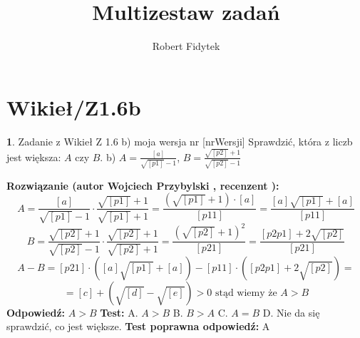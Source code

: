 \documentclass[12pt, a4paper]{article}
\title{Multizestaw zadań}
\author{Robert Fidytek}
\date{}
\theoremstyle{definition} %
\newtheorem{zad}{}
\newcommand{\kategoria}[1]{\section{#1}} %
\newcommand{\zadStart}[1]{\begin{zad}#1\newline} %
\newcommand{\zadStop}{\end{zad}}   %
\newcommand{\rozwStart}[2]{\noindent \textbf{Rozwiązanie (autor #1 , recenzent #2): }\newline} %
\newcommand{\rozwStop}{\newline}                                            %
\newcommand{\odpStart}{\noindent \textbf{Odpowiedź:}\newline}    %
\newcommand{\odpStop}{\newline}                                             %
\newcommand{\testStart}{\noindent \textbf{Test:}\newline} %
\newcommand{\testStop}{\newline} %
\newcommand{\kluczStart}{\noindent \textbf{Test poprawna odpowiedź:}\newline} %
\newcommand{\kluczStop}{\newline} %
\begin{document}
\maketitle


\kategoria{Wikieł/Z1.6b}
\zadStart{Zadanie z Wikieł Z 1.6 b) moja wersja nr [nrWersji]}
Sprawdzić, która z liczb jest większa: $A$ czy $B$.
b) $A=\frac{[a]}{\sqrt{[p1]}-1}$, $B=\frac{\sqrt{[p2]}+1}{\sqrt{[p2]}-1}$
\zadStop
\rozwStart{Wojciech Przybylski}{}
$$A=\frac{[a]}{\sqrt{[p1]}-1}\cdot \frac{\sqrt{[p1]}+1}{\sqrt{[p1]}+1}=\frac{(\sqrt{[p1]}+1)\cdot [a]}{[p11]}=\frac{[a]\sqrt{[p1]}+[a]}{[p11]}$$
$$B=\frac{\sqrt{[p2]}+1}{\sqrt{[p2]}-1}\cdot \frac{\sqrt{[p2]}+1}{\sqrt{[p2]}+1}=\frac{(\sqrt{[p2]}+1)^{2}}{[p21]}=\frac{[p2p1]+2\sqrt{[p2]}}{[p21]}$$
$$A-B=[p21]\cdot([a]\sqrt{[p1]}+[a])-[p11]\cdot([p2p1]+2\sqrt{[p2]})=$$
$$=[c]+(\sqrt{[d]}-\sqrt{[e]})>0 \mbox{ stąd wiemy że }A>B$$
\rozwStop
\odpStart
$A>B$
\odpStop
\testStart
A. $A>B$
B. $B>A$
C. $A=B$
D. Nie da się sprawdzić, co jest większe.
\testStop
\kluczStart
A
\kluczStop
\end{document}
